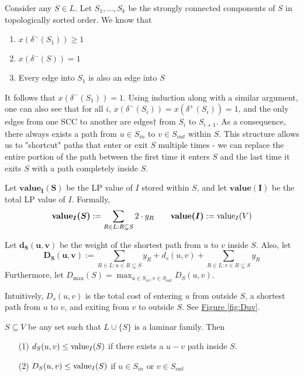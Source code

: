 
Consider any $S\in L$. Let $S_1,\ldots, S_k$ be the strongly connected components of $S$ in topologically sorted order. We know that
\begin{enumerate}
	\item $x(\delta^-(S_1)) \geq 1$
	\item $x(\delta^-(S)) = 1$
	\item Every edge into $S_1$ is also an edge into $S$
\end{enumerate}
It follows that $x(\delta^-(S_1)) = 1$. Using induction along with a similar argument, one can also see that for all $i$, $x(\delta^-(S_i)) = x(\delta^+(S_i)) = 1$, and the only edges from one SCC to another are edges† from $S_i$ to $S_{i + 1}$. As a consequence, there always exists a path from $u\in S_{in}$ to $v\in S_{out}$ within $S$. This structure allows us to "shortcut" paths that enter or exit $S$ multiple times - we can replace the entire portion of the path between the first time it enters $S$ and the last time it exits $S$ with a path completely inside $S$.\vspace{2mm}
\vspace{4mm}
\begin{definition} Let $\bm{\textbf{value}_I(S)}$ be the LP value of $I$ stored within $S$, and let $\bm{\textbf{value}(I)}$ be the total LP value of $I$. Formally, $$\bm{\textbf{value}_I(S)}:=\sum\limits_{R\in L:R\subsetneq S}2\cdot y_R\qquad \bm{\textbf{value}(I)}:=\textup{value}_I(V)$$
\end{definition}\vspace{2mm}
\begin{definition} Let $\bm{d_S(u,v)}$ be the weight of the shortest path from $u$ to $v$ inside $S$. Also, let \begin{equation}\bm{D_S(u,v)}:=\sum_{R\in L : u\in R\subsetneq S}y_R + d_s(u,v) + \sum_{R\in L : v\in R\subsetneq S}y_R\label{def-1}\end{equation}
	Furthermore, let $D_{\max}(S) = \max_{u \in S_{in}, v \in S_{out}}D_S(u,v)$.
\end{definition}

Intuitively, $D_s(u,v)$ is the total cost of entering $u$ from outside $S$, a shortest path from $u$ to $v$, and exiting from $v$ to outside $S$. See \hyperref[fig:Duv]{Figure \ref{fig:Duv}}.\vspace{2mm}
\begin{lemma}\label{lemm:2:D-val} $S\subseteq V$ be any set such that $L\cup \{S\}$ is a laminar family. Then\begin{enumerate}
	\item[(1)] $d_S(u,v)\leq \textup{value}_I(S)$ if there exists a $u-v$ path inside $S$.
	\item[(2)] $D_S(u,v)\leq \textup{value}_I(S)$ if $u\in S_{in}$ or $v\in S_{out}$
	\end{enumerate}
\end{lemma}
